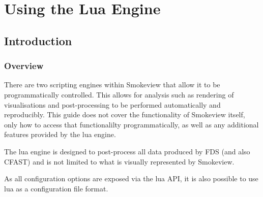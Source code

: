 \documentclass[11pt,twoside]{book}
\begin{document}



\cleardoublepage
\tableofcontents

\cleardoublepage
\listoffigures

\cleardoublepage
\listoftables

\mainmatter



\part{Using the Lua Engine}
\chapter{Introduction}
\section{Overview}
There are two scripting engines within Smokeview that allow it to be
programmatically controlled. This allows for analysis such as rendering of
visualisations and post-processing to be performed automatically and
reproducibly. This guide does not cover the functionality of Smokeview itself,
only how to access that functionalilty programmatically, as well as any
additional features provided by the lua engine.

The lua engine is designed to post-process all data produced by FDS (and also
CFAST) and is not limited to what is visually represented by Smokeview.

As all configuration options are exposed via the lua API, it is also possible to
use lua as a configuration file format.
\end{document}
